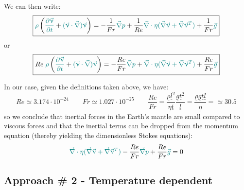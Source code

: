 \documentclass[a4paper,11pt]{article}
\begin{document}
We can then write:
\[
\boxed{
{\color{teal}\rho} \left(
{\color{teal} \frac{\partial \vec\upnu}{\partial t}}
+
{\color{teal} (\vec\upnu \cdot\vec\nabla) \vec\upnu}  \right)
=
- \frac{1}{Fr} {\color{teal} \vec\nabla p}
+
\frac{1}{Re}
{\color{teal} \vec\nabla \cdot \eta (\vec\nabla \vec \upnu + \vec\nabla \vec \upnu ^T)}
+ \frac{1}{Fr} {\color{teal} \vec{g}}
}
\]
or 
\[
\boxed{
Re \; {\color{teal}\rho} \left(
{\color{teal} \frac{\partial \vec\upnu}{\partial t}}
+
{\color{teal} (\vec\upnu \cdot\vec\nabla) \vec\upnu}  \right)
=
- \frac{Re}{Fr} {\color{teal} \vec\nabla p}
+
{\color{teal} \vec\nabla \cdot \eta (\vec\nabla \vec \upnu + \vec\nabla \vec \upnu ^T)}
+ \frac{Re}{Fr} {\color{teal} \vec{g}}
}
\]



In our case, given the definitions taken above, we have:
\[
Re \simeq 3.174 \cdot 10^{-24}
\qquad
Fr \simeq 1.027 \cdot 10^{-25}
\qquad
\frac{Re}{Fr} = 
\frac{\underline{\rho} \underline{l}^2}{\underline{\eta} \underline{t} }
\frac{\underline{g}\underline{t}^2 }{\underline{l}}
=\frac{\underline{\rho} \underline{g}\underline{t} \underline{l}}{\underline{\eta}  }
=\simeq 30.5
\]
so we conclude that inertial forces in the Earth's mantle
are small compared to viscous forces
and that the inertial terms can be dropped from the momentum 
equation (thereby yielding the dimensionless Stokes equations):
\[
{\color{teal} \vec\nabla \cdot \eta (\vec\nabla \vec \upnu + \vec\nabla \vec \upnu ^T)}
- \frac{Re}{Fr} {\color{teal} \vec\nabla p}
+ \frac{Re}{Fr}  {\color{teal} \vec{g} }
=0
\]



\subsection{Approach \# 2 - Temperature dependent \label{ss:dimeqs2}}
\end{document}

